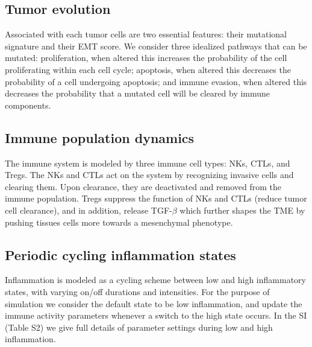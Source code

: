 \documentclass[11pt]{article}
\begin{document}
\subsection{Tumor evolution}\label{TissueCells}
Associated with each tumor cells are two essential features: their mutational signature and their EMT score. We consider three idealized pathways that can be mutated: proliferation, when altered this increases the probability of the cell proliferating within each cell cycle; apoptosis, when altered this decreases the probability of a cell undergoing apoptosis; and immune evasion, when altered this decreases the probability that a mutated cell will be cleared by immune components.
 
\subsection{Immune population dynamics}\label{ImmuneSystem}
The immune system is modeled by three immune cell types: NKs, CTLs, and Tregs.
The NKs and CTLs act on the system by recognizing invasive cells and clearing them.
Upon clearance, they are deactivated and removed from the immune population.
Tregs suppress the function of NKs and CTLs (reduce tumor cell clearance), and in addition, release TGF-$\beta$ which further shapes the TME by pushing tissues cells more towards a mesenchymal phenotype.

\subsection{Periodic cycling inflammation states} 
Inflammation is modeled as a cycling scheme between low and high inflammatory states, with varying on/off durations and intensities.
For the purpose of simulation we consider the default state to be low inflammation, and update the immune activity parameters whenever a switch to the high state occurs.
In the SI (Table S2) we give full details of parameter settings during low and high inflammation.
\end{document}
